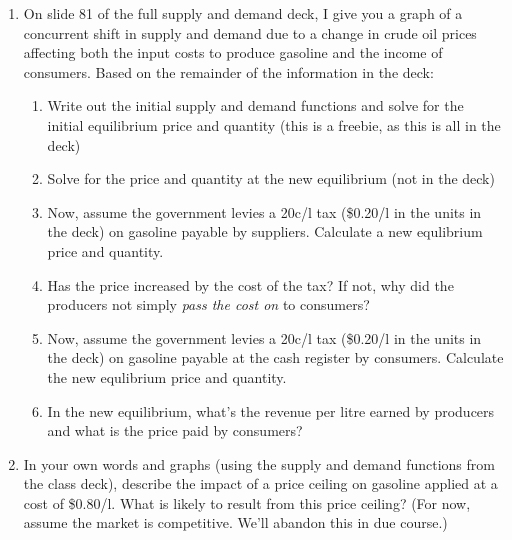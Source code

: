 \documentclass[11pt,]{article}
\providecommand{\tightlist}{%
  \setlength{\itemsep}{0pt}\setlength{\parskip}{0pt}}
\begin{document}
\begin{enumerate}
\def\labelenumi{\arabic{enumi}.}
\setcounter{enumi}{2}
\tightlist
\item
  On slide 81 of the full supply and demand deck, I give you a graph of
  a concurrent shift in supply and demand due to a change in crude oil
  prices affecting both the input costs to produce gasoline and the
  income of consumers. Based on the remainder of the information in the
  deck:

  \begin{enumerate}
  \def\labelenumii{\alph{enumii})}
  \tightlist
  \item
    Write out the initial supply and demand functions and solve for the
    initial equilibrium price and quantity (this is a freebie, as this
    is all in the deck)
  \item
    Solve for the price and quantity at the new equilibrium (not in the
    deck)
  \item
    Now, assume the government levies a 20c/l tax (\$0.20/l in the units
    in the deck) on gasoline payable by suppliers. Calculate a new
    equlibrium price and quantity.
  \item
    Has the price increased by the cost of the tax? If not, why did the
    producers not simply \textit{pass the cost on} to consumers?
  \item
    Now, assume the government levies a 20c/l tax (\$0.20/l in the units
    in the deck) on gasoline payable at the cash register by consumers.
    Calculate the new equlibrium price and quantity.
  \item
    In the new equilibrium, what's the revenue per litre earned by
    producers and what is the price paid by consumers?\\
    \newpage
  \end{enumerate}
\item
  In your own words and graphs (using the supply and demand functions
  from the class deck), describe the impact of a price ceiling on
  gasoline applied at a cost of \$0.80/l. What is likely to result from
  this price ceiling? (For now, assume the market is competitive. We'll
  abandon this in due course.)
\end{enumerate}
\end{document}
